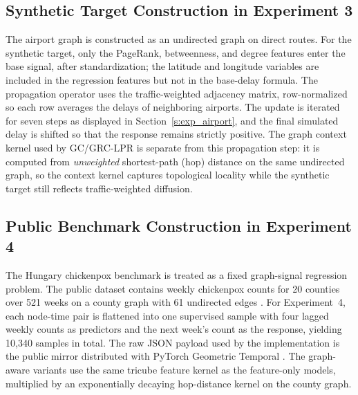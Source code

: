 \documentclass[final,1p,times,authoryear]{elsarticle}
\begin{document}
\subsection{Synthetic Target Construction in Experiment 3}
The airport graph is constructed as an undirected graph on direct routes. For the synthetic target, only the PageRank, betweenness, and degree features enter the base signal, after standardization; the latitude and longitude variables are included in the regression features but not in the base-delay formula. The propagation operator uses the traffic-weighted adjacency matrix, row-normalized so each row averages the delays of neighboring airports. The update is iterated for seven steps as displayed in Section~\ref{s:exp_airport}, and the final simulated delay is shifted so that the response remains strictly positive. The graph context kernel used by GC/GRC-LPR is separate from this propagation step: it is computed from \emph{unweighted} shortest-path (hop) distance on the same undirected graph, so the context kernel captures topological locality while the synthetic target still reflects traffic-weighted diffusion.

\subsection{Public Benchmark Construction in Experiment 4}
The Hungary chickenpox benchmark is treated as a fixed graph-signal regression problem. The public dataset contains weekly chickenpox counts for 20 counties over 521 weeks on a county graph with 61 undirected edges \citep{rozemberczki2021chickenpox}. For Experiment~4, each node-time pair is flattened into one supervised sample with four lagged weekly counts as predictors and the next week's count as the response, yielding 10{,}340 samples in total. The raw JSON payload used by the implementation is the public mirror distributed with PyTorch Geometric Temporal \citep{pyg_temporal_chickenpox_2026}. The graph-aware variants use the same tricube feature kernel as the feature-only models, multiplied by an exponentially decaying hop-distance kernel on the county graph.
\end{document}
